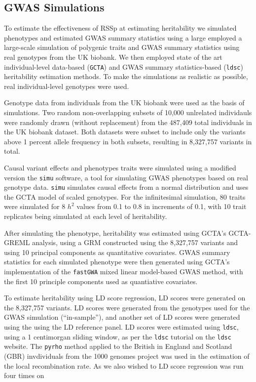 \subsection{GWAS Simulations}
To estimate the effectiveness of RSSp at estimating heritability we simulated phenotypes and estimated GWAS summary statistics using a large employed a large-scale simulation of polygenic traits and GWAS summary statistics using real genotypes from the UK biobank.  We then employed state of the art individual-level data-based (\texttt{GCTA}\cite{GCTA}) and GWAS summary statistics-based (\texttt{ldsc}\cite{ldsc}) heritability estimation methods.  To make the simulations as realistic as possible, real individual-level genotypes were used.

Genotype data from individuals from the UK biobank were used as the basis of simulations. Two random non-overlapping subsets of 10,000 unlrelated individauls were randomly drawn (without replacement) from the 487,409 total individuals in the UK biobank dataset.  Both datasets were subset to include only the variants above 1 percent allele frequency in both subsets, resulting in 8,327,757 variants in total.

Causal variant effects and phenotypes traits were simulated using a modified version the \texttt{simu} software, a tool for simulating GWAS phenotypes based on real genotype data.  \texttt{simu} simulates causal effects from a normal distribution and uses the GCTA model of scaled genotypes.   For the infinitesimal simulation, 80 traits were simulated for 8 $h^2$ values from  0.1 to 0.8 in increments of 0.1, with 10 trait replicates
being simulated at each level of heritability.

After simulating the phenotype, heritability was estimated using GCTA's GCTA-GREML analysis, using a GRM constructed using the 8,327,757 variants and using 10 principal components as quantitative covariates. GWAS summary statistics for each simulated phenotype were then generated using GCTA's implementation of the \texttt{fastGWA} mixed linear model-based GWAS method, with the first 10 principle components used as quantiative covariates.

To estimate heritability using LD score regression, LD scores were generated on the 8,327,757 variants.  LD scores were generated from the genotypes used for the GWAS simulation (``in-sample''), and another set of LD scores were generated using the using the LD reference panel.  LD scores were estimated using \texttt{ldsc}, using a 1 centimorgan sliding window, as per the \texttt{ldsc} tutorial \cite{ldsctutorial} on the \texttt{ldsc} website.  The \texttt{pyrho} method applied to the British in England and Scotland (GBR) invdividuals from the 1000 genomes project\cite{1kg} was used in the estimation of the local recombination rate.  As we also wished to LD score regression was run four times on 

